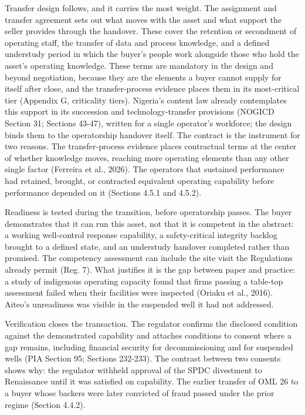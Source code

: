 Transfer design follows, and it carries the most weight. The assignment
and transfer agreement sets out what moves with the asset and what
support the seller provides through the handover. These cover the
retention or secondment of operating staff, the transfer of data and
process knowledge, and a defined understudy period in which the buyer's
people work alongside those who hold the asset's operating knowledge.
These terms are mandatory in the design and beyond negotiation, because
they are the elements a buyer cannot supply for itself after close, and
the transfer-process evidence places them in its most-critical tier
(Appendix G, criticality tiers). Nigeria's content law already
contemplates this support in its succession and technology-transfer
provisions (NOGICD Section 31; Sections 43-47), written for a single
operator's workforce; the design binds them to the operatorship handover
itself. The contract is the instrument for two reasons. The
transfer-process evidence places contractual terms at the center of
whether knowledge moves, reaching more operating elements than any other
single factor (Ferreira et al., 2026). The operators that sustained
performance had retained, brought, or contracted equivalent operating
capability before performance depended on it (Sections 4.5.1 and 4.5.2).

Readiness is tested during the transition, before operatorship passes.
The buyer demonstrates that it can run this asset, not that it is
competent in the abstract: a working well-control response capability, a
safety-critical integrity backlog brought to a defined state, and an
understudy handover completed rather than promised. The competency
assessment can include the site visit the Regulations already permit
(Reg. 7). What justifies it is the gap between paper and practice: a
study of indigenous operating capacity found that firms passing a
table-top assessment failed when their facilities were inspected (Oriaku
et al., 2016). Aiteo's unreadiness was visible in the suspended well it
had not addressed.

Verification closes the transaction. The regulator confirms the
disclosed condition against the demonstrated capability and attaches
conditions to consent where a gap remains, including financial security
for decommissioning and for suspended wells (PIA Section 95; Sections
232-233). The contrast between two consents shows why: the regulator
withheld approval of the SPDC divestment to Renaissance until it was
satisfied on capability. The earlier transfer of OML 26 to a buyer whose
backers were later convicted of fraud passed under the prior regime
(Section 4.4.2).

